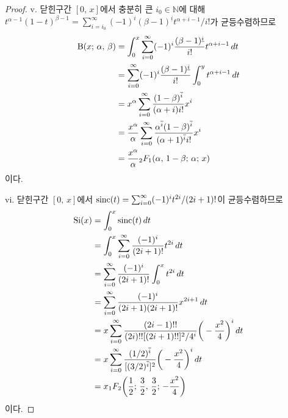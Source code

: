 \begin{proof}
    v. 닫힌구간 $[0,\,x]$에서 충분히 큰 $i_0\in\mathbb{N}$에 대해 $t^{\alpha-1}(1-t)^{\beta-1}=\sum_{i=i_0}^\infty(-1)^i(\beta-1)^{\underline{i}}t^{\alpha+i-1}/i!$가 균등수렴하므로
    \begin{align*}
        \mathrm{B}(x;\,\alpha,\,\beta)&=\int_0^x\sum_{i=0}^\infty(-1)^i\frac{(\beta-1)^{\underline{i}}}{i!}t^{\alpha+i-1}\,dt\\
        &=\sum_{i=0}^\infty(-1)^i\frac{(\beta-1)^{\underline{i}}}{i!}\int_0^yt^{\alpha+i-1}\,dt\\
        &=x^\alpha\sum_{i=0}^\infty\frac{(1-\beta)^{\overline{i}}}{(\alpha+i)i!}x^i\\
        &=\frac{x^\alpha}{\alpha}\sum_{i=0}^\infty\frac{\alpha^{\overline{i}}(1-\beta)^{\overline{i}}}{(\alpha+1)^{\overline{i}}i!}x^i\\
        &=\frac{x^\alpha}{\alpha}{}_2F_1(\alpha,\,1-\beta;\,\alpha;\,x)
    \end{align*}
    이다.

    vi. 닫힌구간 $[0,\,x]$에서 $\mathrm{sinc}(t)=\sum_{i=0}^\infty(-1)^it^{2i}/(2i+1)!$이 균등수렴하므로
    \begin{align*}
        \mathrm{Si}(x)&=\int_0^x\mathrm{sinc}(t)\,dt\\
        &=\int_0^x\sum_{i=0}^\infty\frac{(-1)^i}{(2i+1)!}t^{2i}\,dt\\
        &=\sum_{i=0}^\infty\frac{(-1)^i}{(2i+1)!}\int_0^xt^{2i}\,dt\\
        &=\sum_{i=0}^\infty\frac{(-1)^i}{(2i+1)(2i+1)!}x^{2i+1}\,dt\\
        &=x\sum_{i=0}^\infty\frac{(2i-1)!!}{(2i)!![(2i+1)!!]^2/4^i}\bigg(-\frac{x^2}{4}\bigg)^i\,dt\\
        &=x\sum_{i=0}^\infty\frac{(1/2)^{\overline{i}}}{[(3/2)^{\overline{i}}]^2}\bigg(-\frac{x^2}{4}\bigg)^i\,dt\\
        &=x_1F_2\bigg(\frac{1}{2};\,\frac{3}{2},\,\frac{3}{2};\,-\frac{x^2}{4}\bigg)
    \end{align*}
    이다.
\end{proof}

